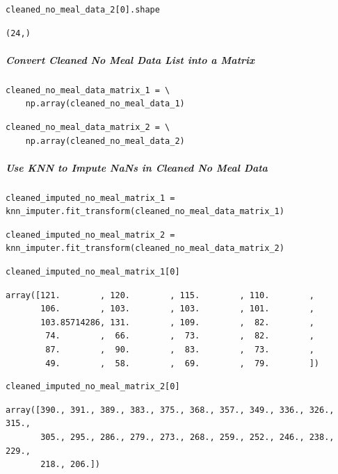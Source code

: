 \begin{verbatim}
cleaned_no_meal_data_2[0].shape
\end{verbatim}

\begin{verbatim}
(24,)
\end{verbatim}

\subparagraph{Convert Cleaned No Meal Data List into a Matrix}

\begin{verbatim}
cleaned_no_meal_data_matrix_1 = \
    np.array(cleaned_no_meal_data_1)
\end{verbatim}

\begin{verbatim}
cleaned_no_meal_data_matrix_2 = \
    np.array(cleaned_no_meal_data_2)
\end{verbatim}

\subparagraph{Use KNN to Impute NaNs in Cleaned No Meal Data}

\begin{verbatim}
cleaned_imputed_no_meal_matrix_1 = knn_imputer.fit_transform(cleaned_no_meal_data_matrix_1)
\end{verbatim}

\begin{verbatim}
cleaned_imputed_no_meal_matrix_2 = knn_imputer.fit_transform(cleaned_no_meal_data_matrix_2)
\end{verbatim}

\begin{verbatim}
cleaned_imputed_no_meal_matrix_1[0]
\end{verbatim}

\begin{verbatim}
array([121.        , 120.        , 115.        , 110.        ,
       106.        , 103.        , 103.        , 101.        ,
       103.85714286, 131.        , 109.        ,  82.        ,
        74.        ,  66.        ,  73.        ,  82.        ,
        87.        ,  90.        ,  83.        ,  73.        ,
        49.        ,  58.        ,  69.        ,  79.        ])
\end{verbatim}

\begin{verbatim}
cleaned_imputed_no_meal_matrix_2[0]
\end{verbatim}

\begin{verbatim}
array([390., 391., 389., 383., 375., 368., 357., 349., 336., 326., 315.,
       305., 295., 286., 279., 273., 268., 259., 252., 246., 238., 229.,
       218., 206.])
\end{verbatim}

